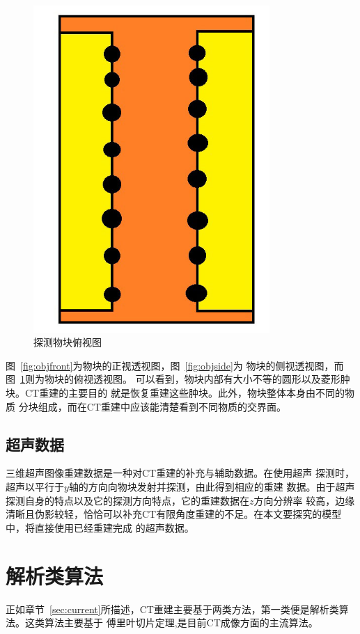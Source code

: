 \begin{figure}[h!]
\center
\includegraphics[width=0.8\textwidth]{figure/object/top}
\caption{探测物块俯视图}\label{fig:objtop}
\end{figure}
图~\ref{fig:objfront}为物块的正视透视图，图~\ref{fig:objside}为
物块的侧视透视图，而图~\ref{fig:objtop}则为物块的俯视透视图。
可以看到，物块内部有大小不等的圆形以及菱形肿块。CT重建的主要目的
就是恢复重建这些肿块。此外，物块整体本身由不同的物质
分块组成，而在CT重建中应该能清楚看到不同物质的交界面。

\subsection{超声数据}
三维超声图像重建数据是一种对CT重建的补充与辅助数据。在使用超声
探测时，超声以平行于$y$轴的方向向物块发射并探测，由此得到相应的重建
数据。由于超声探测自身的特点以及它的探测方向特点，它的重建数据在$z$方向分辨率
较高，边缘清晰且伪影较轻，恰恰可以补充CT有限角度重建的不足。在本文要探究的模型中，将直接使用已经重建完成
的超声数据。

\section{解析类算法}
正如章节~\ref{sec:current}所描述，CT重建主要基于两类方法，第一类便是解析类算法。这类算法主要基于
傅里叶切片定理\cite{bracewell1986fourier},是目前CT成像方面的主流算法。
